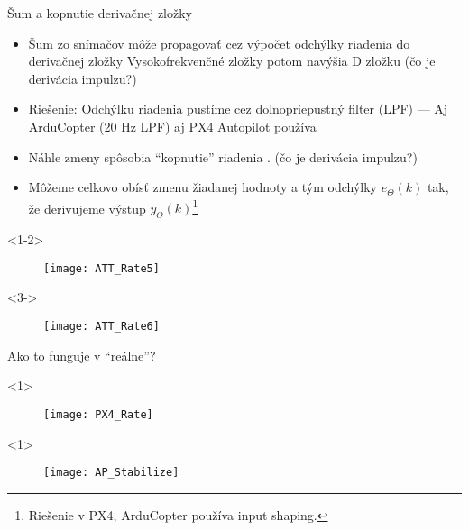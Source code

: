 \begin{frame}[t]{Šum a kopnutie derivačnej zložky}
  \begin{itemize}
    \item<1-2> Šum zo snímačov môže propagovať cez výpočet odchýlky riadenia do derivačnej zložky Vysokofrekvenčné zložky potom navýšia D zložku (čo je derivácia impulzu?)
    \item<2> Riešenie: Odchýlku riadenia pustíme cez dolnopriepustný  filter (LPF) --- Aj ArduCopter (20 Hz LPF) aj PX4 Autopilot používa \citep{AP:PID,PX4:PID}
    \item<3-> Náhle zmeny spôsobia ``kopnutie'' riadenia . (čo je derivácia impulzu?)
    \item<4-> Môžeme celkovo obísť zmenu žiadanej hodnoty a tým odchýlky  $e_\Theta(k)$ tak, že derivujeme výstup $y_\Theta(k)$\footnote{Riešenie v PX4, ArduCopter používa input shaping.}
  \end{itemize}
      \begin{onlyenv}<1-2>
  \begin{figure}
\centering
  \texttt{[image: ATT\_Rate5]}\\
\end{figure}
\end{onlyenv}

\begin{onlyenv}<3->
  \begin{figure}
\centering
  \texttt{[image: ATT\_Rate6]}\\
\end{figure}
\end{onlyenv}


\end{frame}

\begin{frame}{Ako to funguje v ``reálne''?}
\begin{onlyenv}<1>
  \begin{figure}
\centering
  \texttt{[image: PX4\_Rate]}\\
\end{figure}
\end{onlyenv}

\begin{onlyenv}<1>
  \begin{figure}
\centering
  \texttt{[image: AP\_Stabilize]}\\
\end{figure}
\end{onlyenv}


\end{frame} 
